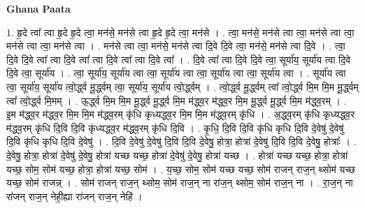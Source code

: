 \documentclass[17pt]{extarticle}
\begin{document}
\textbf{Ghana Paata } \newline

1. हृ॒दे त्वा᳚ त्वा हृ॒दे हृ॒दे त्वा॒ मन॑से॒ मन॑से त्वा हृ॒दे हृ॒दे त्वा॒ मन॑से । . त्वा॒ मन॑से॒ मन॑से त्वा त्वा॒ मन॑से त्वा त्वा॒ मन॑से त्वा त्वा॒ मन॑से त्वा । . मन॑से त्वा त्वा॒ मन॑से॒ मन॑से त्वा दि॒वे दि॒वे त्वा॒ मन॑से॒ मन॑से त्वा दि॒वे । . त्वा॒ दि॒वे दि॒वे त्वा᳚ त्वा दि॒वे त्वा᳚ त्वा दि॒वे त्वा᳚ त्वा दि॒वे त्वा᳚ । . दि॒वे त्वा᳚ त्वा दि॒वे दि॒वे त्वा॒ सूर्या॑य॒ सूर्या॑य त्वा दि॒वे दि॒वे त्वा॒ सूर्या॑य । . त्वा॒ सूर्या॑य॒ सूर्या॑य त्वा त्वा॒ सूर्या॑य त्वा त्वा॒ सूर्या॑य त्वा त्वा॒ सूर्या॑य त्वा । . सूर्या॑य त्वा त्वा॒ सूर्या॑य॒ सूर्या॑य त्वो॒र्द्ध्व मू॒र्द्ध्वम् त्वा॒ सूर्या॑य॒ सूर्या॑य त्वो॒र्द्ध्वम् । . त्वो॒र्द्ध्व मू॒र्द्ध्वम् त्वा᳚ त्वो॒र्द्ध्व मि॒म मि॒म मू॒र्द्ध्वम् त्वा᳚ त्वो॒र्द्ध्व मि॒मम् । . ऊ॒र्द्ध्व मि॒म मि॒म मू॒र्द्ध्व मू॒र्द्ध्व मि॒म म॑द्ध्व॒र म॑द्ध्व॒र मि॒म मू॒र्द्ध्व मू॒र्द्ध्व मि॒म म॑द्ध्व॒रम् । . इ॒म म॑द्ध्व॒र म॑द्ध्व॒र मि॒म मि॒म म॑द्ध्व॒रम् कृ॑धि कृध्यद्ध्व॒र मि॒म मि॒म म॑द्ध्व॒रम् कृ॑धि । . अ॒द्ध्व॒रम् कृ॑धि कृध्यद्ध्व॒र म॑द्ध्व॒रम् कृ॑धि दि॒वि दि॒वि कृ॑ध्यद्ध्व॒र म॑द्ध्व॒रम् कृ॑धि दि॒वि । . कृ॒धि॒ दि॒वि दि॒वि कृ॑धि कृधि दि॒वि दे॒वेषु॑ दे॒वेषु॑ दि॒वि कृ॑धि कृधि दि॒वि दे॒वेषु॑ । . दि॒वि दे॒वेषु॑ दे॒वेषु॑ दि॒वि दि॒वि दे॒वेषु॒ होत्रा॒ होत्रा॑ दे॒वेषु॑ दि॒वि दि॒वि दे॒वेषु॒ होत्राः᳚ । . दे॒वेषु॒ होत्रा॒ होत्रा॑ दे॒वेषु॑ दे॒वेषु॒ होत्रा॑ यच्छ यच्छ॒ होत्रा॑ दे॒वेषु॑ दे॒वेषु॒ होत्रा॑ यच्छ । . होत्रा॑ यच्छ यच्छ॒ होत्रा॒ होत्रा॑ यच्छ॒ सोम॒ सोम॑ यच्छ॒ होत्रा॒ होत्रा॑ यच्छ॒ सोम॑ । . य॒च्छ॒ सोम॒ सोम॑ यच्छ यच्छ॒ सोम॑ राजन् राज॒न् थ्सोम॑ यच्छ यच्छ॒ सोम॑ राजन्न् । . सोम॑ राजन् राज॒न् थ्सोम॒ सोम॑ राज॒न् ना रा॑ज॒न् थ्सोम॒ सोम॑ राज॒न् ना । . रा॒ज॒न् ना रा॑जन् राज॒न् नेही॒ह्या रा॑जन् राज॒न् नेहि॑ । \newline
\end{document}
